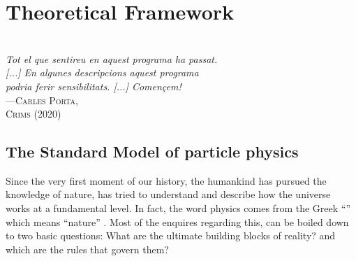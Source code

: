 \begin{comment}
%
%
\end{comment}


\chapter{Theoretical Framework}
\label{chap:Introduction}



\vspace*{0.1 cm} 
\hspace*{200pt} \\
\hspace*{120pt} \textit{Tot el que sentireu en aquest programa ha passat.} \\
\hspace*{120pt} \textit{[...] En algunes descripcions aquest programa} \\
\hspace*{120pt} \textit{podria ferir sensibilitats. [...] Començem!} \\
\hspace*{205pt} ---\textsc{Carles Porta,} \\%
\hspace*{240 pt}     \textsc{Crims (2020)} \\%
\vspace*{2cm} 


\section{The Standard Model of particle physics}
\label{sec:chap1:TheSM}
Since the very first moment of our history, the humankind has pursued the knowledge of nature,
has tried to understand and describe how the universe works at a fundamental level. 
In fact, the word physics comes from the Greek ``\greekphys'' which means 
``nature'' \cite{etymology_web}\cite{Greek_web}.
Most of the enquires regarding this, can be boiled down to two basic questions:
What are the ultimate building blocks of reality? and which are the rules that govern them?

